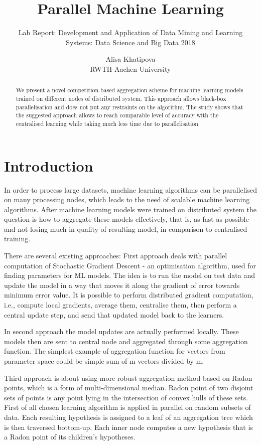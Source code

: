 \documentclass{scrartcl}
\title{Parallel Machine Learning}
\subtitle{Lab Report: Development and Application of Data Mining and Learning Systems: Data Science and Big Data 2018}
\date{}
\author{
Alisa Khatipova\\
RWTH-Aachen University
}
\begin{document}
\maketitle

\begin{abstract}
We present a novel competition-based aggregation scheme for machine learning models trained on different nodes of distributed system.  This approach allows black-box parallelisation and does not put any restraints on the algorithm. The study shows that the suggested approach allows to reach comparable level of accuracy with the centralised learning while taking much less time due to parallelisation.
\end{abstract}

\section{Introduction}
In order to process large datasets, machine learning algorithms can be parallelised on many processing nodes, which leads to the need of scalable machine learning algorithms. After machine learning models were trained on distributed system the question is how to aggregate these models effectively, that is, as fast as possible and not losing much in quality of resulting model, in comparison to centralised training.

There are several existing approaches: 
First approach deals with parallel computation of Stochastic Gradient Descent - an optimisation algorithm, used for finding parameters for ML models. The idea is to run the model on test data and update the model in a way that moves it along the gradient of error towards minimum error value. It is possible to perform distributed gradient computation, i.e., compute local gradients, average them, centralise them, then perform a central update step, and send that updated model back to the learners.

In second approach the model updates are actually performed locally. These models then are sent to central node and aggregated through some aggregation function. The simplest example of aggregation function for vectors from parameter space could be simple sum of m vectors divided by m.

Third approach is about using more robust aggregation method based on Radon points, which is a form of multi-dimensional median. Radon point of two disjoint sets of points is any point lying in the intersection of convex hulls of these sets. First of all chosen learning algorithm is applied in parallel on random subsets of data. Each resulting hypothesis is assigned to a leaf of an aggregation tree which is then traversed bottom-up. Each inner node computes a new hypothesis that is a Radon point of its children’s hypotheses.
\end{document}
